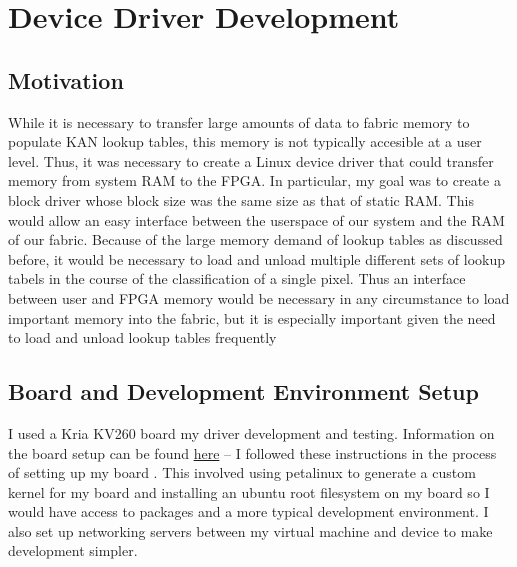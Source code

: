 \documentclass[psamsfonts]{amsart}
\newcommand{\mycomment}[1]{}
\theoremstyle{definition}
\theoremstyle{remark}
\numberwithin{equation}{section}
\begin{document}
\section{Device Driver Development}

\subsection{Motivation}
While it is necessary to transfer large amounts of data to fabric memory to populate KAN lookup tables, this memory is not typically accesible at a user level. Thus, it was necessary to create a Linux device driver that could transfer memory from system RAM to the FPGA. In particular, my goal was to create a block driver whose block size was the same size as that of static RAM\mycomment{This is not even what I ended up writing lol}. This would allow an easy interface between the userspace of our system and the RAM of our fabric. Because of the large memory demand of lookup tables as discussed before, it would be necessary to load and unload multiple different sets of lookup tabels in the course of the classification of a single pixel. Thus an interface between user and FPGA memory would be necessary in any circumstance to load important memory into the fabric, but it is especially important given the need to load and unload lookup tables frequently %

\subsection{Board and Development Environment Setup}
I used a Kria KV260 board my driver development and testing. Information on the board setup can be found \href{https://github.com/night1rider/Xilinx-KR260-Intro/blob/Hello-World/Documentation/00_hello_world_kr260.md}{here} -- I followed these instructions in the process of setting up my board \cite{board-setup}. This involved using petalinux to generate a custom kernel for my board and installing an ubuntu root filesystem on my board so I would have access to packages and a more typical development environment. I also set up networking servers between my virtual machine and device to make development simpler.
\end{document}
